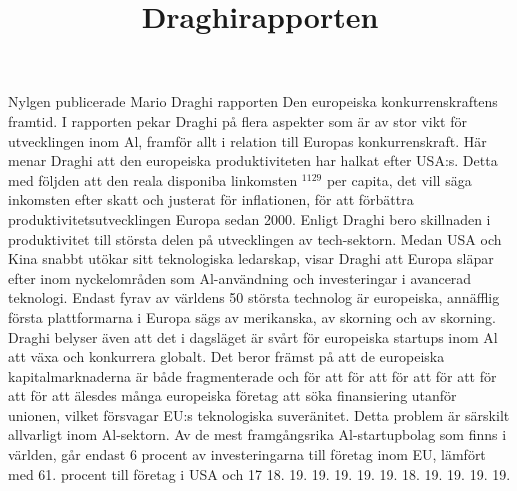 {{{{{{{{{{{{{{{{\title{
Draghirapporten
}
Nylgen publicerade Mario Draghi rapporten Den europeiska konkurrenskraftens framtid. I rapporten pekar Draghi på flera aspekter som är av stor vikt för utvecklingen inom Al, framför allt i relation till Europas konkurrenskraft.
Här menar Draghi att den europeiska produktiviteten har halkat efter USA:s. Detta med följden att den reala disponiba linkomsten \({ }^{1129}\) per capita, det vill säga inkomsten efter skatt och justerat för inflationen, för att förbättra produktivitetsutvecklingen Europa sedan 2000. Enligt Draghi bero skillnaden i produktivitet till största delen på utvecklingen av tech-sektorn. Medan USA och Kina snabbt utökar sitt teknologiska ledarskap, visar Draghi att Europa släpar efter inom nyckelområden som Al-användning och investeringar i avancerad teknologi. Endast fyrav av världens 50 största technolog är europeiska, annäfflig första plattformarna i Europa sägs av merikanska, av skorning och av skorning.
Draghi belyser även att det i dagsläget är svårt för europeiska startups inom Al att växa och konkurrera globalt. Det beror främst på att de europeiska kapitalmarknaderna är både fragmenterade och för att för att för att för att för att för att älesdes många europeiska företag att söka finansiering utanför unionen, vilket försvagar EU:s teknologiska suveränitet. Detta problem är särskilt allvarligt inom Al-sektorn. Av de mest framgångsrika Al-startupbolag som finns i världen, går endast 6 procent av investeringarna till företag inom EU, lämfört med 61. procent till företag i USA och 17 18. 19. 19. 19. 19. 19. 18. 19. 19. 19. 19.
}}}}}}}}}}}}}}}}
